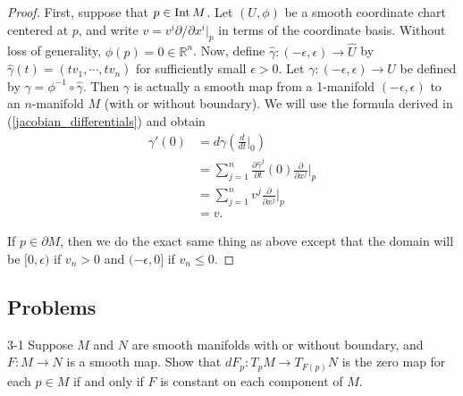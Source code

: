 \begin{proof}
  First, suppose that $p \in \operatorname{Int} M$.
  Let $(U, \phi)$ be a smooth coordinate chart centered at $p$, and write $v = v^i \partial / \partial x^i\vert_p$ in terms of the coordinate basis.
  Without loss of generality, $\phi(p) = 0 \in \mathbb{R}^n$.
  Now, define $\hat{\gamma}: (-\epsilon, \epsilon) \rightarrow \hat{U}$ by $\hat{\gamma}(t) = (tv_1, \cdots, tv_n)$ for sufficiently small $\epsilon > 0$.
  Let $\gamma: (-\epsilon, \epsilon) \rightarrow U$ be defined by $\gamma = \phi^{-1} \circ \hat{\gamma}$.
  Then $\gamma$ is actually a smooth map from a 1-manifold $(-\epsilon, \epsilon)$ to an $n$-manifold $M$ (with or without boundary).
  We will use the formula derived in (\ref{jacobian_differentials}) and obtain
  \begin{align*}
    \gamma'(0)
      &= d\gamma(\frac{d}{dt}\Big\vert_{0}) \\
      &= \sum_{j=1}^{n}\frac{\partial\hat{\gamma}^j}{\partial t}(0)\frac{\partial}{\partial x^j}\Big\vert_{p} \\
      &= \sum_{j=1}^{n}v^j\frac{\partial}{\partial x^j}\Big\vert_{p} \\
      &= v.
  \end{align*}

  If $p \in \partial M$, then we do the exact same thing as above except that the domain will be $[0, \epsilon)$ if $v_n > 0$ and $(-\epsilon, 0]$ if $v_n \leq 0$.
\end{proof}

\subsection{Problems}

\begin{customprob}{3-1}
  Suppose $M$ and $N$ are smooth manifolds with or without boundary, and $F: M \rightarrow N$ is a smooth map.
  Show that $dF_p: T_pM \rightarrow T_{F(p)}N$ is the zero map for each $p \in M$ if and only if $F$ is constant on each component of $M$.
\end{customprob}

